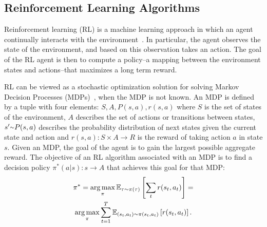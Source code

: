 \subsection{Reinforcement Learning Algorithms}
Reinforcement learning (RL) is a machine learning approach in which an agent continually interacts with the environment~\cite{kaelbling1996reinforcement}. In particular, the agent observes the state of the environment, and based on this observation takes an action. The goal of the RL agent is then to compute a policy--a mapping between the environment states and actions--that maximizes a long term reward. 

RL can be viewed as a stochastic optimization solution for solving Markov Decision Processes (MDPs)~\cite{bellman1957}, when the MDP is not known. An MDP 
is defined by a tuple with four elements:
${S,A,P(s,a),r(s,a)}$ where $S$ is the set of states of the environment, $A$ describes the set of actions or transitions between states, $s' {\raise.17ex\hbox{$\scriptstyle\mathtt{\sim}$}} P(s,a)$ describes the probability distribution of next states given the current state and action and $r(s,a):S \times A \rightarrow R$ is the reward of taking action $a$ in state $s$. Given an MDP, the goal of the agent is to gain the largest possible aggregate reward. The objective of an RL algorithm associated with an MDP is to find a decision policy $\pi^*(a|s):s\rightarrow A$ that achieves this goal for that MDP:
\begin{multline}
\label{eq:MDP}
    \pi^* = \argmaxA_\pi \mathbb{E}_{\tau{\raise.05ex\hbox{$\scriptstyle\mathtt{\sim}$}}\pi(\tau)} \left[\sum_{t}^{}r(s_t,a_t) \right] = \\
    \argmaxA_\pi \sum_{t=1}^{T}\mathbb{E}_{(s_t,a_t){\raise.05ex\hbox{$\scriptstyle\mathtt{\sim}$}}\pi(s_t,a_t)}\left[r(s_t,a_t)\right].
\end{multline}


